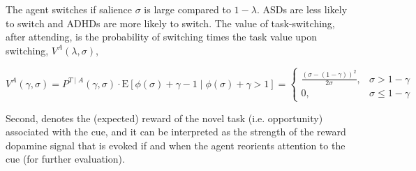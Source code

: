\documentclass{article}
\begin{document}
The agent switches if salience $\sigma$ is large compared to $1-\lambda$. ASDs are less likely to switch and ADHDs are more likely to switch. 
The value of task-switching, after attending, is the probability of switching times the task value upon switching, $V^{A}(\lambda,\sigma)$,

$$
V^{A}(\gamma, \sigma)=P^{T \mid A}(\gamma, \sigma) \cdot \mathrm{E}[\phi(\sigma)+\gamma-1 \mid \phi(\sigma)+\gamma>1]=\left\{\begin{array}{cl}
\frac{(\sigma-(1-\gamma))^{2}}{2 \sigma}, & \sigma>1-\gamma \\
0, & \sigma \leq 1-\gamma
\end{array}\right.
$$

Second, denotes the (expected) reward of the novel task (i.e. opportunity) associated with the cue, and it can be interpreted as the strength of the reward dopamine signal that is evoked if and when the agent reorients attention to the cue (for further evaluation). 
\end{document}
